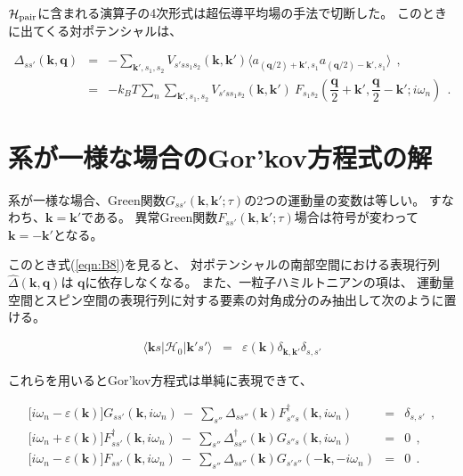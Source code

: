\documentclass[uplatex,a4j,12pt,dvipdfmx]{jsarticle}
\begin{document}
$\mathcal{H}_{\rm pair}$に含まれる演算子の4次形式は超伝導平均場の手法で切断した。
このときに出てくる対ポテンシャルは、

\begin{eqnarray}
	\Delta_{ss'}(\bm{k},\bm{q})
	&=&
	- \sum_{\bm{k}' , s_{1} , s_{2}}
	V_{s' s s_{1} s_{2}}(\bm{k},\bm{k}')
	\langle
	a_{(\bm{q}/2) + \bm{k}' , s_{1}}
	a_{(\bm{q}/2) - \bm{k}' , s_{1}}
	\rangle
	\ \ ,
	\nonumber \\[2mm] &=&
	- k_{B} T
	\sum_{n}
	\sum_{\bm{k}' , s_{1} , s_{2}}
	V_{s' s s_{1} s_{2}}(\bm{k},\bm{k}')
	\ \!
	F_{s_{1} s_{2}}(\dfrac{\bm{q}}{2} + \bm{k}' , \dfrac{\bm{q}}{2} - \bm{k}' ; i \omega_{n})
	\ \ .
	\label{eqn:B8}
\end{eqnarray}

\section{系が一様な場合のGor'kov方程式の解}

系が一様な場合、Green関数$G_{ss'}(\bm{k} , \bm{k}' ; \tau)$の2つの運動量の変数は等しい。
すなわち、$\bm{k}=\bm{k}'$である。
異常Green関数$F_{ss'}(\bm{k} , \bm{k}' ; \tau)$場合は符号が変わって$\bm{k}=-\bm{k}'$となる。

このとき式(\ref{eqn:B8})を見ると、
対ポテンシャルの南部空間における表現行列$\hat{\Delta}(\bm{k},\bm{q})$は
$\bm{q}$に依存しなくなる。
また、一粒子ハミルトニアンの項は、
運動量空間とスピン空間の表現行列に対する要素の対角成分のみ抽出して次のように置ける。

\begin{eqnarray}
	\langle \bm{k} s |  \mathcal{H}_{0} | \bm{k}' s' \rangle
	&=&
	\varepsilon(\bm{k}) \delta_{\bm{k},\bm{k}'} \delta_{s,s'}
	\nonumber
\end{eqnarray}

これらを用いるとGor'kov方程式は単純に表現できて、

\begin{eqnarray}
	\Big[
		i \omega_{n} - \varepsilon(\bm{k})
		\Big]
	G_{ss'}(\bm{k} , i \omega_{n} )
	\ - \
	\sum_{s''}
	\Delta_{s s''}(\bm{k})
	F_{s'' s}^{\dagger}(\bm{k},i \omega_{n})
	&=&
	\delta_{s,s'}
	\ \ ,
	\\[2mm]
	\Big[
		i \omega_{n} + \varepsilon(\bm{k})
		\Big]
	F_{ss'}^{\dagger}(\bm{k} , i \omega_{n} )
	\ - \
	\sum_{s''}
	\Delta_{s s''}^{\dagger}(\bm{k})
	G_{s'' s}(\bm{k},i \omega_{n})
	&=&
	0
	\ \ ,
	\\[2mm]
	\Big[
		i \omega_{n} - \varepsilon(\bm{k})
		\Big]
	F_{ss'}(\bm{k} , i \omega_{n} )
	\ - \
	\sum_{s''}
	\Delta_{s s''}(\bm{k})
	G_{s' s''}( - \bm{k}, - i \omega_{n})
	&=&
	0
	\ \ .
\end{eqnarray}
\end{document}
